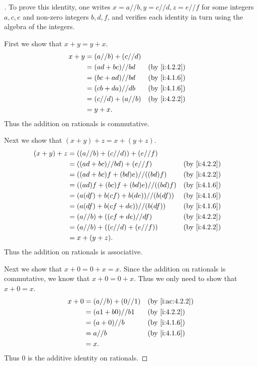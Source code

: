 \begin{proof}[]
  To prove this identity, one writes \(x = a // b, y = c // d, z = e // f\) for some integers \(a, c, e\) and non-zero integers \(b, d, f\), and verifies each identity in turn using the algebra of the integers.

  First we show that \(x + y = y + x\).
  \begin{align*}
    x + y & = (a // b) + (c // d)                   \\
          & = (ad + bc) // bd     &  & \by{i:4.2.2} \\
          & = (bc + ad) // bd     &  & \by{i:4.1.6} \\
          & = (cb + da) // db     &  & \by{i:4.1.6} \\
          & = (c // d) + (a // b) &  & \by{i:4.2.2} \\
          & = y + x.
  \end{align*}
  Thus the addition on rationals is commutative.

  Next we show that \((x + y) + z = x + (y + z)\).
  \begin{align*}
    (x + y) + z & = ((a // b) + (c // d)) + (e // f)                     \\
                & = ((ad + bc) // bd) + (e // f)       &  & \by{i:4.2.2} \\
                & = ((ad + bc)f + (bd)e) // ((bd)f)    &  & \by{i:4.2.2} \\
                & = ((ad)f + (bc)f + (bd)e) // ((bd)f) &  & \by{i:4.1.6} \\
                & = (a(df) + b(cf) + b(de)) // (b(df)) &  & \by{i:4.1.6} \\
                & = (a(df) + b(cf + de)) // (b(df))    &  & \by{i:4.1.6} \\
                & = (a // b) + ((cf + de) // df)       &  & \by{i:4.2.2} \\
                & = (a // b) + ((c // d) + (e // f))   &  & \by{i:4.2.2} \\
                & = x + (y + z).
  \end{align*}
  Thus the addition on rationals is associative.

  Next we show that \(x + 0 = 0 + x = x\).
  Since the addition on rationals is commutative, we know that \(x + 0 = 0 + x\).
  Thus we only need to show that \(x + 0 = x\).
  \begin{align*}
    x + 0 & = (a // b) + (0 // 1) &  & \by{i:ac:4.2.2} \\
          & = (a1 + b0) // b1     &  & \by{i:4.2.2}    \\
          & = (a + 0) // b        &  & \by{i:4.1.6}    \\
          & = a // b              &  & \by{i:4.1.6}    \\
          & = x.
  \end{align*}
  Thus \(0\) is the additive identity on rationals.


\end{proof}
